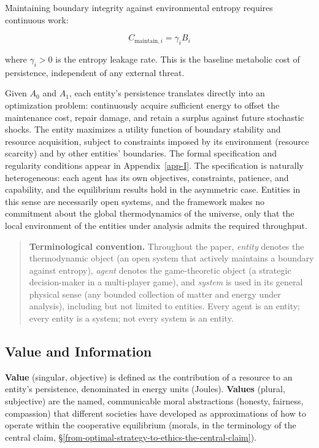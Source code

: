 \documentclass[11pt]{article}
\theoremstyle{plain}
\theoremstyle{definition}
\theoremstyle{remark}
\let\origsubsection\subsection
\renewcommand{\subsection}{\needspace{7\baselineskip}\origsubsection}
\begin{document}
Maintaining boundary integrity against environmental entropy requires
continuous work:

\[C_{\text{maintain},i} = \gamma_i B_i\]

where \(\gamma_i > 0\) is the entropy leakage rate. This is the baseline
metabolic cost of persistence, independent of any external threat.

Given \(A_0\) and \(A_1\), each entity's persistence translates directly
into an optimization problem: continuously acquire sufficient energy to
offset the maintenance cost, repair damage, and retain a surplus against
future stochastic shocks. The entity maximizes a utility function of
boundary stability and resource acquisition, subject to constraints
imposed by its environment (resource scarcity) and by other entities'
boundaries. The formal specification and regularity conditions appear in
Appendix~\ref{app-I}. The specification is naturally heterogeneous: each
agent has its own objectives, constraints, patience, and capability, and
the equilibrium results hold in the asymmetric case. Entities in this
sense are necessarily open systems, and the framework makes no
commitment about the global thermodynamics of the universe, only that
the local environment of the entities under analysis admits the required
throughput.

\begin{quote}
\textbf{Terminological convention.} Throughout the paper, \emph{entity}
denotes the thermodynamic object (an open system that actively maintains
a boundary against entropy), \emph{agent} denotes the game-theoretic
object (a strategic decision-maker in a multi-player game), and
\emph{system} is used in its general physical sense (any bounded
collection of matter and energy under analysis), including but not
limited to entities. Every agent is an entity; every entity is a system;
not every system is an entity.
\end{quote}

\subsection{Value and Information}\label{value-and-information}

\textbf{Value} (singular, objective) is defined as the contribution of a
resource to an entity's persistence, denominated in energy units
(Joules). \textbf{Values} (plural, subjective) are the named,
communicable moral abstractions (honesty, fairness, compassion) that
different societies have developed as approximations of how to operate
within the cooperative equilibrium (morals, in the terminology of the
central claim,
§\ref{from-optimal-strategy-to-ethics-the-central-claim}).
\end{document}
